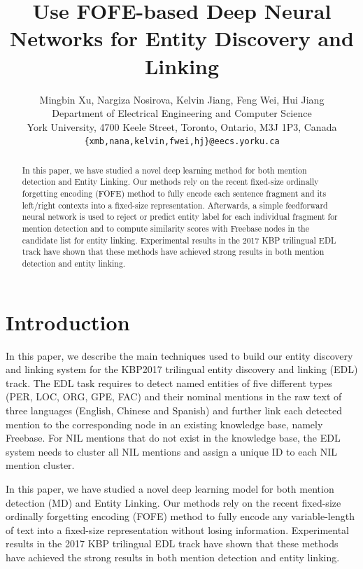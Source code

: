 \documentclass[11pt]{article}
\title{Use FOFE-based Deep Neural Networks for Entity Discovery and Linking}
\author{Mingbin Xu, Nargiza Nosirova, Kelvin Jiang, Feng Wei, Hui Jiang \\
	Department of Electrical Engineering and Computer Science \\
	York University,  4700 Keele Street, Toronto, Ontario, M3J 1P3, Canada\\
	{\tt \{xmb,nana,kelvin,fwei,hj\}@eecs.yorku.ca}
}
\date{}
\begin{document}
\maketitle

\begin{abstract}
In this paper, we have studied a novel deep learning method for both mention detection and Entity Linking. Our methods rely on the recent fixed-size ordinally forgetting encoding (FOFE) method to fully encode each sentence fragment and its left/right contexts into a fixed-size representation. Afterwards, a simple feedforward neural network is used to reject or predict entity label for each individual fragment for mention detection and to compute similarity scores with Freebase nodes in the candidate list for entity linking. Experimental results in the 2017 KBP trilingual EDL track have shown that these methods have achieved strong results in both mention detection and entity linking.
\end{abstract}

\section{Introduction}

In this paper, we describe the main techniques used to build our entity discovery and linking system for the KBP2017 trilingual entity discovery and linking (EDL) track. 
The EDL task requires to detect named
entities of five different types (PER, LOC, ORG, GPE, FAC) 
and their nominal mentions in the raw text
of three languages (English, Chinese and Spanish)
and further link each detected mention to the corresponding
node in an existing knowledge base,
namely Freebase. For NIL mentions that do not exist
in the knowledge base, the EDL system needs to
cluster all NIL mentions and assign a unique ID to
each NIL mention cluster.

In this paper, we have studied a novel deep learning model for both mention detection (MD) and Entity Linking. Our methods rely on the recent fixed-size ordinally forgetting encoding (FOFE) method to fully encode any variable-length of text into a fixed-size representation without losing information. 
Experimental results in the 2017 KBP trilingual EDL track have shown that these methods have achieved the strong results in both mention detection and entity linking.
\end{document}
